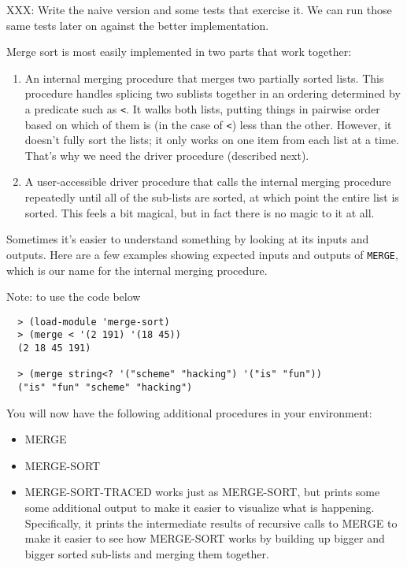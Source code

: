 \documentclass[12pt,openright,draft]{book}
\begin{document}
XXX: Write the naive version and some tests that exercise it.  We can
run those same tests later on against the better implementation.

Merge sort is most easily implemented in two parts that work together:

\begin{enumerate}

\item An internal merging procedure that merges two partially sorted
  lists.  This procedure handles splicing two sublists together in an
  ordering determined by a predicate such as \verb|<|. It walks both
  lists, putting things in pairwise order based on which of them is
  (in the case of \verb|<|) less than the other.  However, it doesn't
  fully sort the lists; it only works on one item from each list at a
  time.  That's why we need the driver procedure (described next).

\item A user-accessible driver procedure that calls the internal
  merging procedure repeatedly until all of the sub-lists are sorted,
  at which point the entire list is sorted.  This feels a bit magical,
  but in fact there is no magic to it at all.

\end{enumerate}

Sometimes it's easier to understand something by looking at its inputs
and outputs.  Here are a few examples showing expected inputs and
outputs of \verb|MERGE|, which is our name for the internal merging
procedure.

Note: to use the code below

\begin{verbatim}
  > (load-module 'merge-sort)
  > (merge < '(2 191) '(18 45))
  (2 18 45 191)

  > (merge string<? '("scheme" "hacking") '("is" "fun"))
  ("is" "fun" "scheme" "hacking")
\end{verbatim}

You will now have the following additional procedures in your
environment:

\begin{itemize}
\item MERGE
\item MERGE-SORT
\item MERGE-SORT-TRACED works just as MERGE-SORT, but prints some
  some additional output to make it easier to visualize what is
  happening.  Specifically, it prints the intermediate results of
  recursive calls to MERGE to make it easier to see how MERGE-SORT
  works by building up bigger and bigger sorted sub-lists and merging
  them together.
\end{itemize}
\end{document}
